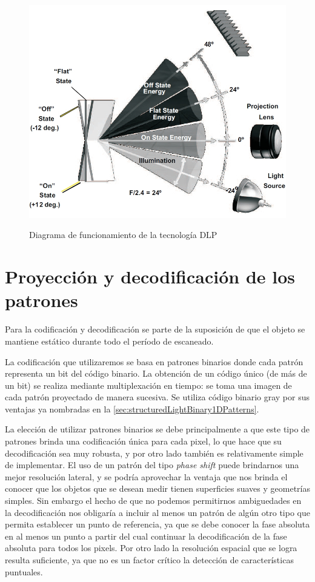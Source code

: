 \begin{figure}[!bth]
    \myfloatalign
        {\includegraphics[width=1.0\linewidth]{images/DLP_mirrorOpticalDiagram}}
        \caption{Diagrama de funcionamiento de la tecnología DLP}
        \label{fig:dlpMirrorOpticalDiagram}
\end{figure}

\section{Proyección y decodificación de los patrones}
Para la codificación y decodificación se parte de la suposición de que el objeto se mantiene estático durante todo el período de escaneado.

La codificación que utilizaremos se basa en patrones binarios donde cada patrón representa un bit del código binario. La obtención de un código único (de más de un bit) se realiza mediante multiplexación en tiempo: se toma una imagen de cada patrón proyectado de manera sucesiva. Se utiliza código binario gray por sus ventajas ya nombradas en la \autoref{sec:structuredLightBinary1DPatterns}. 

La elección de utilizar patrones binarios se debe principalmente a que este tipo de patrones brinda una codificación única para cada pixel, lo que hace que su decodificación sea muy robusta, y por otro lado también es relativamente simple de implementar. El uso de un patrón del tipo \emph{phase shift} puede brindarnos una mejor resolución lateral, y se podría aprovechar la ventaja que nos brinda el conocer que los objetos que se desean medir tienen superficies suaves y geometrías simples. Sin embargo el hecho de que no podemos permitirnos ambiguedades en la decodificación nos obligaría a incluir al menos un patrón de algún otro tipo que permita establecer un punto de referencia, ya que se debe conocer la fase absoluta en al menos un punto a partir del cual continuar la decodificación de la fase absoluta para todos los pixels. Por otro lado la resolución espacial que se logra resulta suficiente, ya que no es un factor crítico la detección de características puntuales. 

